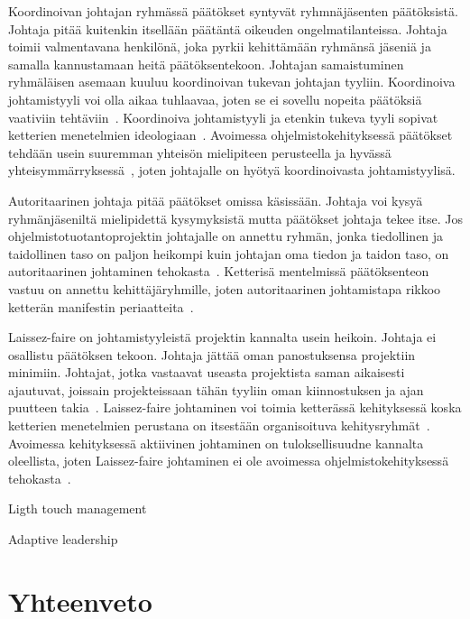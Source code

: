 \documentclass[finnish]{tktltiki2}
\theoremstyle{definition}
\theoremstyle{remark}
\begin{document}
Koordinoivan johtajan ryhmässä päätökset syntyvät ryhmnäjäsenten päätöksistä. Johtaja pitää kuitenkin itsellään päätäntä oikeuden ongelmatilanteissa. Johtaja toimii valmentavana henkilönä, joka pyrkii kehittämään ryhmänsä jäseniä ja samalla kannustamaan heitä päätöksentekoon. Johtajan samaistuminen ryhmäläisen asemaan kuuluu koordinoivan tukevan johtajan tyyliin. Koordinoiva johtamistyyli voi olla aikaa tuhlaavaa, joten se ei sovellu nopeita päätöksiä vaativiin tehtäviin~\cite{Dhomne:2012:ITL:2382887.2382899}. Koordinoiva johtamistyyli ja etenkin tukeva tyyli sopivat ketterien menetelmien ideologiaan~\cite{fowler2001agile}. Avoimessa ohjelmistokehityksessä päätökset tehdään usein suuremman yhteisön mielipiteen perusteella ja hyvässä yhteisymmärryksessä~\cite{1385637}, joten johtajalle on hyötyä koordinoivasta johtamistyylisä.

Autoritaarinen johtaja pitää päätökset omissa käsissään. Johtaja voi kysyä ryhmänjäseniltä mielipidettä kysymyksistä mutta päätökset johtaja tekee itse. Jos ohjelmistotuotantoprojektin johtajalle on annettu ryhmän, jonka tiedollinen ja taidollinen taso on paljon heikompi kuin johtajan oma tiedon ja taidon taso, on autoritaarinen johtaminen tehokasta~\cite{Dhomne:2012:ITL:2382887.2382899}. Ketterisä mentelmissä päätöksenteon vastuu on annettu kehittäjäryhmille, joten autoritaarinen johtamistapa rikkoo ketterän manifestin periaatteita~\cite{fowler2001agile}.

Laissez-faire on johtamistyyleistä projektin kannalta usein heikoin. Johtaja ei osallistu päätöksen tekoon. Johtaja jättää oman panostuksensa projektiin minimiin. Johtajat, jotka vastaavat useasta projektista saman aikaisesti ajautuvat, joissain projekteissaan tähän tyyliin oman kiinnostuksen ja ajan puutteen takia~\cite{Dhomne:2012:ITL:2382887.2382899}. Laissez-faire johtaminen voi toimia ketterässä kehityksessä koska ketterien menetelmien perustana on itsestään organisoituva kehitysryhmät~\cite{fowler2001agile}. Avoimessa kehityksessä aktiivinen johtaminen on tuloksellisuudne kannalta oleellista, joten Laissez-faire johtaminen ei ole avoimessa ohjelmistokehityksessä tehokasta~\cite{Li:2006:MOS:1125170.1125182}.



Ligth touch management

Adaptive leadership




\section{Yhteenveto}
\end{document}
